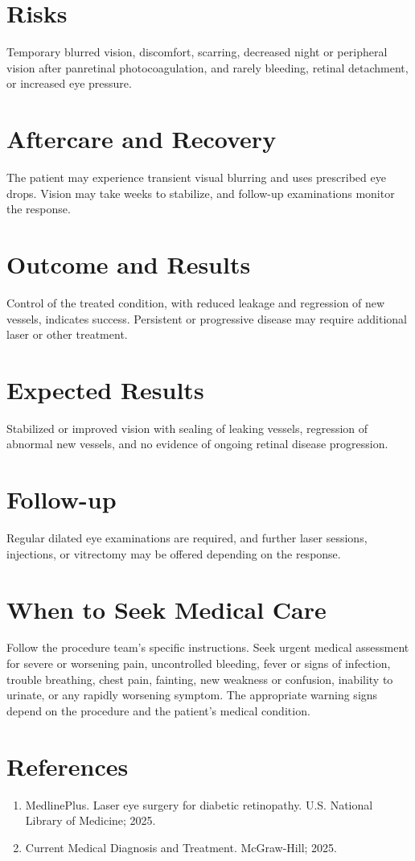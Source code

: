 \section*{Risks}
Temporary blurred vision, discomfort, scarring, decreased night or peripheral vision after panretinal photocoagulation, and rarely bleeding, retinal detachment, or increased eye pressure.

\section*{Aftercare and Recovery}
The patient may experience transient visual blurring and uses prescribed eye drops. Vision may take weeks to stabilize, and follow-up examinations monitor the response.
\section*{Outcome and Results}
Control of the treated condition, with reduced leakage and regression of new vessels, indicates success. Persistent or progressive disease may require additional laser or other treatment.
\section*{Expected Results}
Stabilized or improved vision with sealing of leaking vessels, regression of abnormal new vessels, and no evidence of ongoing retinal disease progression.
\section*{Follow-up}
Regular dilated eye examinations are required, and further laser sessions, injections, or vitrectomy may be offered depending on the response.
\section*{When to Seek Medical Care}
Follow the procedure team's specific instructions. Seek urgent medical assessment for severe or worsening pain, uncontrolled bleeding, fever or signs of infection, trouble breathing, chest pain, fainting, new weakness or confusion, inability to urinate, or any rapidly worsening symptom. The appropriate warning signs depend on the procedure and the patient's medical condition.

\section*{References}
\begin{enumerate}
  \item MedlinePlus. Laser eye surgery for diabetic retinopathy. U.S. National Library of Medicine; 2025.
  \item Current Medical Diagnosis and Treatment. McGraw-Hill; 2025.
\end{enumerate}

\clearpage
